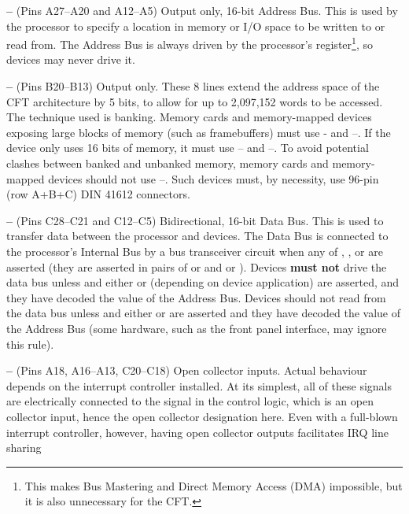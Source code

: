 \begin{description}
\item{\bfseries {}–} (Pins A27–A20 and A12–A5) Output only,
  16-bit Address Bus. This is used by the processor to specify a
  location in memory or I/O space to be written to or read from. The
  Address Bus is always driven by the processor's \MAR{}
  register\footnote{This makes Bus Mastering and Direct Memory Access
    (DMA) impossible, but it is also unnecessary for the CFT.}, so
  devices may never drive it.
\item{\bfseries {}–} (Pins B20–B13) Output only. These 8
  lines extend the address space of the CFT architecture by 5 bits, to
  allow for up to 2,097,152 words to be accessed. The technique used
  is banking. Memory cards and memory-mapped devices exposing large
  blocks of memory (such as framebuffers) must use -
  and –. If the device only uses 16 bits of memory,
  it must use – and –. To avoid
  potential clashes between banked and unbanked memory, memory cards
  and memory-mapped devices should not use –. Such
  devices must, by necessity, use 96-pin (row A+B+C) DIN 41612
  connectors.
\item{\bfseries {}–} (Pins C28–C21 and C12–C5)
  Bidirectional, 16-bit Data Bus. This is used to transfer data
  between the processor and devices. The Data Bus is connected to the
  processor's Internal Bus by a bus transceiver circuit when any of
  \MEM, \IO, \READ{} or \WRITE{} are asserted (they are asserted in
  pairs of \MEM{} or \IO{} and \READ{} or \WRITE). Devices {\bfseries must
    not} drive the data bus unless \READ{} and either \MEM{} or \IO{}
  (depending on device application) are asserted, and they have
  decoded the value of the Address Bus. Devices should not read from
  the data bus unless \WRITE{} and either \MEM{} or \IO{} are asserted
  and they have decoded the value of the Address Bus (some hardware,
  such as the front panel interface, may ignore this rule).
\item{\bfseries {}–} (Pins A18, A16–A13, C20–C18) Open
  collector inputs. Actual behaviour depends on the interrupt
  controller installed. At its simplest, all of these signals are
  electrically connected to the \IRQ{} signal in the control logic,
  which is an open collector input, hence the open collector
  designation here. Even with a full-blown interrupt controller,
  however, having open collector outputs facilitates IRQ line sharing

\end{description}
